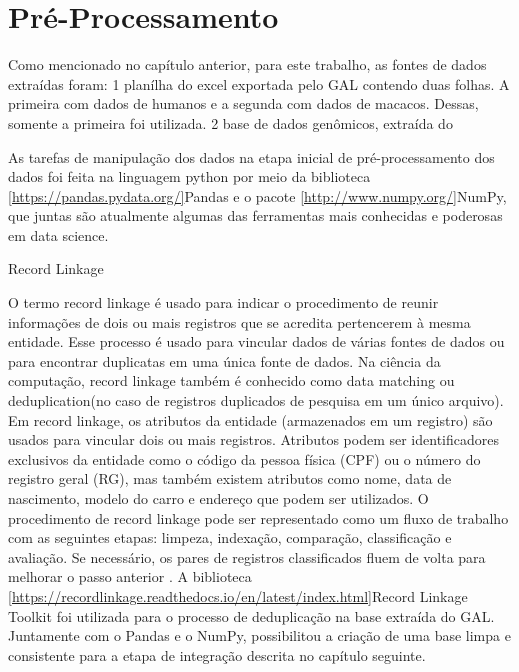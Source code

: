 ﻿\chapter{Pré-Processamento}


Como mencionado no capítulo anterior, para este trabalho, as fontes de dados extraídas foram:
1 planílha do excel exportada pelo GAL contendo duas folhas. A primeira com dados de humanos e a segunda com dados de macacos. Dessas, somente a primeira foi utilizada.
2 base de dados genômicos, extraída do \cite{federhen2011ncbi}


As tarefas de manipulação dos dados na etapa inicial de pré-processamento dos dados foi feita na linguagem python por meio da biblioteca \ref{https://pandas.pydata.org/}{Pandas} e o pacote \ref{http://www.numpy.org/}{NumPy}, que juntas são atualmente algumas das ferramentas mais conhecidas e poderosas em data science.

Record Linkage

O termo record linkage é usado para indicar o procedimento de reunir informações de dois ou mais registros que se acredita pertencerem à mesma entidade.
Esse processo é usado para vincular dados de várias fontes de dados ou para encontrar duplicatas em uma única fonte de dados.
Na ciência da computação, record linkage também é conhecido como data matching ou deduplication(no caso de registros duplicados de pesquisa em um único arquivo).
Em record linkage, os atributos da entidade (armazenados em um registro) são usados para vincular dois ou mais registros.
Atributos podem ser identificadores exclusivos da entidade como o código da pessoa física (CPF) ou o número do registro geral (RG), mas também existem atributos como nome, data de nascimento, modelo do carro e endereço que podem ser utilizados.
O procedimento de record linkage pode ser representado como um fluxo de trabalho com as seguintes etapas: limpeza, indexação, comparação, classificação e avaliação. Se necessário, os pares de registros classificados fluem de volta para melhorar o passo anterior \cite{christen2012data}.
A biblioteca \ref{https://recordlinkage.readthedocs.io/en/latest/index.html}{Record Linkage Toolkit} foi utilizada para o processo de deduplicação na base extraída do GAL. Juntamente com o Pandas e o NumPy, possibilitou a criação de uma base limpa e consistente para a etapa de integração descrita no capítulo seguinte.